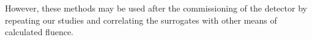 However, these methods may be used after the commissioning of the detector by repeating our studies and correlating the surrogates with other means of calculated fluence.


